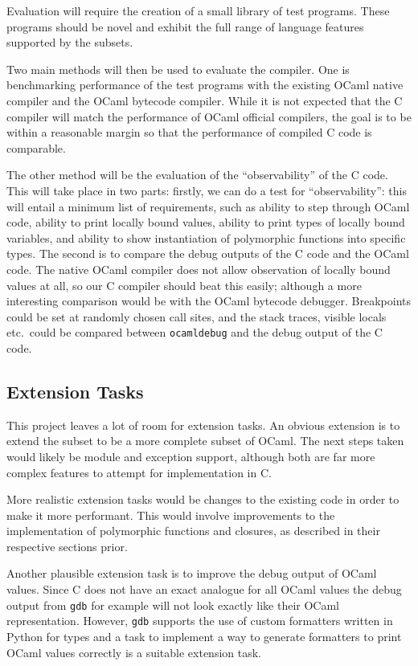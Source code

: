 Evaluation will require the creation of a small library of test programs. These
programs should be novel and exhibit the full range of language features
supported by the subsets.

Two main methods will then be used to evaluate the compiler. One is
benchmarking performance of the test programs with the existing OCaml native
compiler and the OCaml bytecode compiler. While it is not expected that the C
compiler will match the performance of OCaml official compilers, the goal is to
be within a reasonable margin so that the performance of compiled C code is
comparable.

The other method will be the evaluation of the ``observability'' of the C code.
This will take place in two parts: firstly, we can do a test for
``observability'': this will entail a minimum list of requirements, such as
ability to step through OCaml code, ability to print locally bound values,
ability to print types of locally bound variables, and ability to show
instantiation of polymorphic functions into specific types. The second is to
compare the debug outputs of the C code and the OCaml code. The native OCaml
compiler does not allow observation of locally bound values at all, so our C
compiler should beat this easily; although a more interesting comparison would
be with the OCaml bytecode debugger. Breakpoints could be set at randomly
chosen call sites, and the stack traces, visible locals etc.\ could be compared
between \texttt{ocamldebug} and the debug output of the C code.

\subsection*{Extension Tasks}

This project leaves a lot of room for extension tasks. An obvious extension is
to extend the subset to be a more complete subset of OCaml. The next steps
taken would likely be module and exception support, although both are far more
complex features to attempt for implementation in C.

More realistic extension tasks would be changes to the existing code in order
to make it more performant. This would involve improvements to the
implementation of polymorphic functions and closures, as described in their
respective sections prior.

Another plausible extension task is to improve the debug output of OCaml
values. Since C does not have an exact analogue for all OCaml values the debug
output from \texttt{gdb} for example will not look exactly like their OCaml
representation. However, \texttt{gdb} supports the use of custom formatters
written in Python for types and a task to implement a way to generate
formatters to print OCaml values correctly is a suitable extension task.

